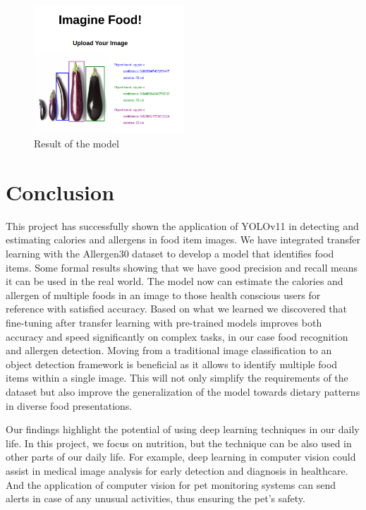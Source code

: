 \documentclass[10pt,twocolumn,letterpaper]{article}
\begin{document}
\begin{figure}[htbp]
    \centering
    \includegraphics[width=0.5\textwidth]{advanced-detector.png}
    \caption{Result of the model}\label{advanced-client-result}
\end{figure}

\section{Conclusion}

This project has successfully shown the application of YOLOv11 in detecting and estimating calories and allergens in food item images. 
We have integrated transfer learning with the Allergen30 dataset to develop a model that identifies food items. 
Some formal results showing that we have good precision and recall means it can be used in the real world.
The model now can estimate the calories and allergen of multiple foods in an image to those health conscious users for reference with satisfied accuracy.
Based on what we learned we discovered that fine-tuning after transfer learning with pre-trained models improves both accuracy and speed significantly on complex tasks, in our case food recognition and allergen detection.
Moving from a traditional image classification to an object detection framework is beneficial as it allows to identify multiple food items within a single image.
This will not only simplify the requirements of the dataset but also improve the generalization of the model towards dietary patterns in diverse food presentations.

Our findings highlight the potential of using deep learning techniques in our daily life. 
In this project, we focus on nutrition, but the technique can be also used in other parts of our daily life.
For example, deep learning in computer vision could assist in medical image analysis for early detection and diagnosis in healthcare.
And the application of computer vision for pet monitoring systems can send alerts in case of any unusual activities, thus ensuring the pet's safety.
\end{document}
